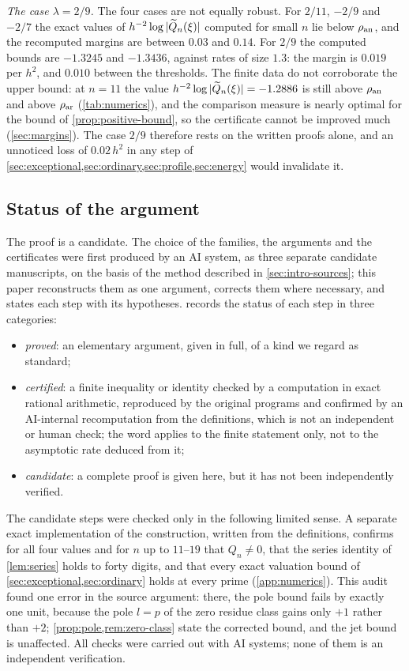 \emph{The case $\lambda=2/9$.} The four cases are not equally robust. For $2/11$, $-2/9$ and $-2/7$ the exact values of $h^{-2}\log|\widetilde{Q}_n(\xi)|$ computed for small $n$ lie below $\rho_{\mathrm{an}}$, and the recomputed margins are between $0.03$ and $0.14$. For $2/9$ the computed bounds are $-1.3245$ and $-1.3436$, against rates of size $1.3$: the margin is $0.019$ per $h^2$, and $0.010$ between the thresholds. The finite data do not corroborate the upper bound: at $n=11$ the value $h^{-2}\log|\widetilde{Q}_n(\xi)|=-1.2886$ is still above $\rho_{\mathrm{an}}$ and above $\rho_{\mathrm{ar}}$ (\cref{tab:numerics}), and the comparison measure is nearly optimal for the bound of \cref{prop:positive-bound}, so the certificate cannot be improved much (\cref{sec:margins}). The case $2/9$ therefore rests on the written proofs alone, and an unnoticed loss of $0.02\,h^2$ in any step of \cref{sec:exceptional,sec:ordinary,sec:profile,sec:energy} would invalidate it.

\subsection{Status of the argument}\label{sec:intro-status}
The proof is a candidate. The choice of the families, the arguments and the certificates were first produced by an AI system, as three separate candidate manuscripts, on the basis of the method described in \cref{sec:intro-sources}; this paper reconstructs them as one argument, corrects them where necessary, and states each step with its hypotheses.  records the status of each step in three categories:
\begin{itemize}
\item \emph{proved}: an elementary argument, given in full, of a kind we regard as standard;
\item \emph{certified}: a finite inequality or identity checked by a computation in exact rational arithmetic, reproduced by the original programs and confirmed by an AI-internal recomputation from the definitions, which is not an independent or human check; the word applies to the finite statement only, not to the asymptotic rate deduced from it;
\item \emph{candidate}: a complete proof is given here, but it has not been independently verified.
\end{itemize}
The candidate steps were checked only in the following limited sense. A separate exact implementation of the construction, written from the definitions, confirms for all four values and for $n$ up to $11$--$19$ that $Q_n\ne0$, that the series identity of \cref{lem:series} holds to forty digits, and that every exact valuation bound of \cref{sec:exceptional,sec:ordinary} holds at every prime (\cref{app:numerics}). This audit found one error in the source argument: there, the pole bound fails by exactly one unit, because the pole $l=p$ of the zero residue class gains only $+1$ rather than $+2$; \cref{prop:pole,rem:zero-class} state the corrected bound, and the jet bound is unaffected. All checks were carried out with AI systems; none of them is an independent verification.


